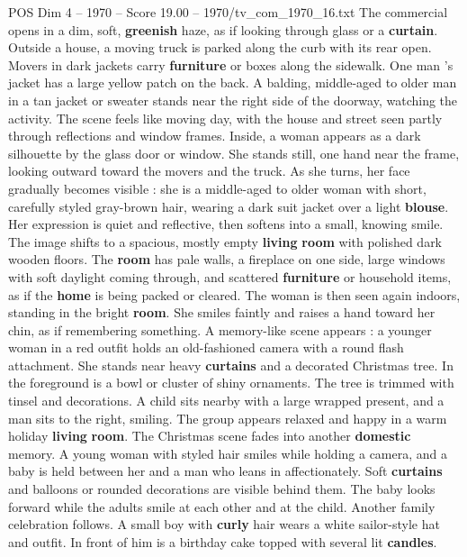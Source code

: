 \begin{textsample}{POS Dim 4 – 1970 – Score 19.00 – 1970/tv\_com\_1970\_16.txt}  \label{ex:f4_pos_081}
The commercial opens in a dim, soft, \textbf{greenish} haze, as if looking through glass or a \textbf{curtain}.
Outside a house, a moving truck is parked along the curb with its rear open.
Movers in dark jackets carry \textbf{furniture} or boxes along the sidewalk.
One man ’s jacket has a large yellow patch on the back.
A balding, middle-aged to older man in a tan jacket or sweater stands near the right side of the doorway, watching the activity.
The scene feels like moving day, with the house and street seen partly through reflections and window frames.
Inside, a woman appears as a dark silhouette by the glass door or window.
She stands still, one hand near the frame, looking outward toward the movers and the truck.
As she turns, her face gradually becomes visible : she is a middle-aged to older woman with short, carefully styled gray-brown hair, wearing a dark suit jacket over a light \textbf{blouse}.
Her expression is quiet and reflective, then softens into a small, knowing smile.
The image shifts to a spacious, mostly empty \textbf{living} \textbf{room} with polished dark wooden floors.
The \textbf{room} has pale walls, a fireplace on one side, large windows with soft daylight coming through, and scattered \textbf{furniture} or household items, as if the \textbf{home} is being packed or cleared.
The woman is then seen again indoors, standing in the bright \textbf{room}.
She smiles faintly and raises a hand toward her chin, as if remembering something.
A memory-like scene appears : a younger woman in a red outfit holds an old-fashioned camera with a round flash attachment.
She stands near heavy \textbf{curtains} and a decorated Christmas tree.
In the foreground is a bowl or cluster of shiny ornaments.
The tree is trimmed with tinsel and decorations.
A child sits nearby with a large wrapped present, and a man sits to the right, smiling.
The group appears relaxed and happy in a warm holiday \textbf{living} \textbf{room}.
The Christmas scene fades into another \textbf{domestic} memory.
A young woman with styled hair smiles while holding a camera, and a baby is held between her and a man who leans in affectionately.
Soft \textbf{curtains} and balloons or rounded decorations are visible behind them.
The baby looks forward while the adults smile at each other and at the child.
Another family celebration follows.
A small boy with \textbf{curly} hair wears a white sailor-style hat and outfit.
In front of him is a birthday cake topped with several lit \textbf{candles}.

\end{textsample}
